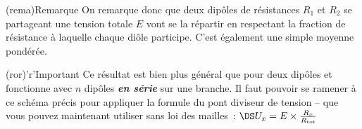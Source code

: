 \documentclass[../TDE1-E2.tex]{subfiles}%
\begin{document}
{\begin{tcbraster}[raster columns=2, raster equal height=rows]
    \begin{tcn}(rema){Remarque}
        On remarque donc que deux dipôles de résistances $R_1$ et $R_2$ se
        partageant une tension totale $E$ vont se la répartir
        en respectant la fraction de résistance à laquelle chaque diôle
        participe. C'est également une simple moyenne pondérée.
    \end{tcn}
    \begin{tcn}(ror)'r'{Important}
        Ce résultat est bien plus général que pour deux dipôles et fonctionne
        avec $n$ dipôles \textbf{\textit{en série}} sur une branche. Il faut
        pouvoir se ramener à ce schéma précis pour appliquer la formule du pont
        diviseur de tension – que vous pouvez maintenant utiliser sans loi des
        mailles~: $\DS U_x = E\times \frac{R_x}{R_\mathrm{tot}}$
    \end{tcn}
\end{tcbraster}
}%

%
\end{document}
